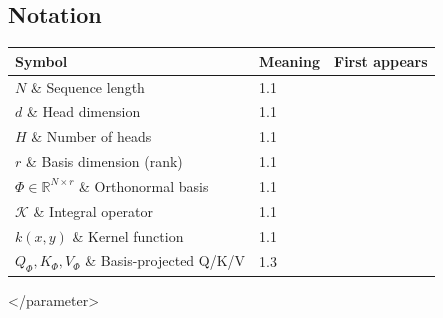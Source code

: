 \subsection{Notation}

\begin{table}[H]
\centering
\small
\begin{tabular}{lll}
\toprule
\textbf{Symbol} & \textbf{Meaning} & \textbf{First appears} \\
\midrule
$N$ \& Sequence length & 1.1 \\
$d$ \& Head dimension & 1.1 \\
$H$ \& Number of heads & 1.1 \\
$r$ \& Basis dimension (rank) & 1.1 \\
$\Phi \in \mathbb{R}^{N \times r}$ \& Orthonormal basis & 1.1 \\
$\mathcal{K}$ \& Integral operator & 1.1 \\
$k(x, y)$ \& Kernel function & 1.1 \\
$Q_\Phi, K_\Phi, V_\Phi$ \& Basis-projected Q/K/V & 1.3 \\
\bottomrule
\end{tabular}
\end{table}
</parameter>

